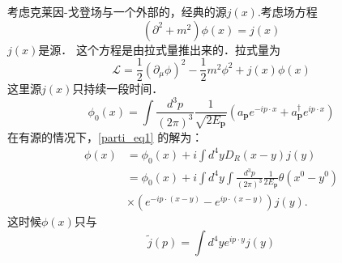 
考虑克莱因-戈登场与一个外部的，经典的源$j(x)$.考虑场方程
\begin{equation}\label{parti_eq1}
(\partial^2+m^2)\phi(x) = j(x)
\end{equation}
$j(x)$是源． 这个方程是由拉式量推出来的．拉式量为
\begin{equation}
\mathcal L = \frac{1}{2} (\partial_\mu\phi)^2 - \frac{1}{2} m^2 \phi^2 + j(x) \phi(x)
\end{equation}
这里源$j(x)$只持续一段时间．
\begin{equation}
\phi_{0}(x)=\int \frac{d^{3} p}{(2 \pi)^{3}} \frac{1}{\sqrt{2 E_{\mathbf{p}}}}\left(a_{\mathbf{p}} e^{-i p \cdot x}+a_{\mathbf{p}}^{\dagger} e^{i p \cdot x}\right)
\end{equation}
在有源的情况下，\autoref{parti_eq1} 的解为：
\begin{equation}
\begin{aligned}
\phi(x) & =\phi_{0}(x)+i \int d^{4} y D_{R}(x-y) j(y) \\
& =\phi_{0}(x)+i \int d^{4} y \int \frac{d^{3} p}{(2 \pi)^{3}} \frac{1}{2 E_{\mathbf{p}}} \theta\left(x^{0}-y^{0}\right) \\
& \times\left(e^{-i p \cdot(x-y)}-e^{i p \cdot(x-y)}\right) j(y) .
\end{aligned}
\end{equation}
这时候$\phi(x)$只与
\begin{equation}
\tilde j (p) = \int d^4 y e^{ip \cdot y} j(y)
\end{equation}